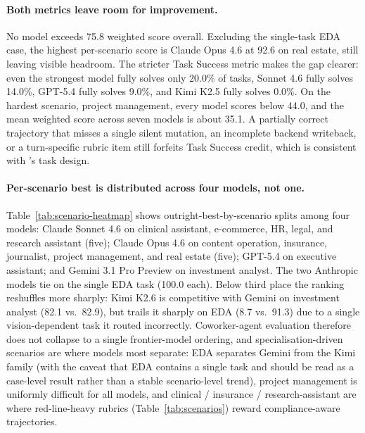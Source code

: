 

\paragraph{Both metrics leave room for improvement.} No model exceeds 75.8 weighted score overall. Excluding the single-task EDA case, the highest per-scenario score is Claude Opus 4.6 at 92.6 on real estate, still leaving visible headroom. The stricter Task Success metric makes the gap clearer: even the strongest model fully solves only 20.0\% of tasks, Sonnet 4.6 fully solves 14.0\%, GPT-5.4 fully solves 9.0\%, and Kimi K2.5 fully solves 0.0\%. On the hardest scenario, project management, every model scores below 44.0, and the mean weighted score across seven models is about 35.1. A partially correct trajectory that misses a single silent mutation, an incomplete backend writeback, or a turn-specific rubric item still forfeits Task Success credit, which is consistent with \bench{}'s task design.

\paragraph{Per-scenario best is distributed across four models, not one.} Table~\ref{tab:scenario-heatmap} shows outright-best-by-scenario splits among four models: Claude Sonnet 4.6 on clinical assistant, e-commerce, HR, legal, and research assistant (five); Claude Opus 4.6 on content operation, insurance, journalist, project management, and real estate (five); GPT-5.4 on executive assistant; and Gemini 3.1 Pro Preview on investment analyst. The two Anthropic models tie on the single EDA task (100.0 each). Below third place the ranking reshuffles more sharply: Kimi K2.6 is competitive with Gemini on investment analyst (82.1 vs.\ 82.9), but trails it sharply on EDA (8.7 vs.\ 91.3) due to a single vision-dependent task it routed incorrectly. Coworker-agent evaluation therefore does not collapse to a single frontier-model ordering, and specialisation-driven scenarios are where models most separate: EDA separates Gemini from the Kimi family (with the caveat that EDA contains a single task and should be read as a case-level result rather than a stable scenario-level trend), project management is uniformly difficult for all models, and clinical / insurance / research-assistant are where red-line-heavy rubrics (Table~\ref{tab:scenarios}) reward compliance-aware trajectories.

